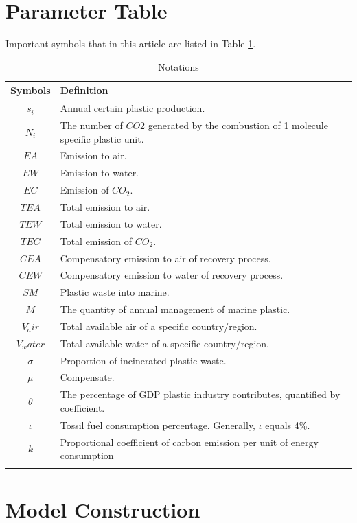 \documentclass{mcmthesis}
\begin{document}
\section{Parameter Table}

Important symbols that in this article are listed in Table \ref{notation}.
\begin{table}[H] 
	\caption{Notations} 
	\center
	\begin{tabular}{cp{}}
		\toprule 
		Symbols &Definition  \\ 
		\midrule 
		$s_i $& Annual certain plastic production.  \\ 
		$N_i$ & The number of $CO2$ generated by the combustion of 1 molecule specific plastic unit. \\ 
		$EA$ & Emission to air. \\ 
		$EW$ & Emission to water.\\
		$EC$ & Emission of $CO_2$.\\
		$TEA$ & Total emission to air.\\
		$TEW$ & Total emission to water.\\
		$TEC$ & Total emission of $CO_2$.\\
		$CEA$ & Compensatory emission to air of recovery process.\\
		$CEW$ & Compensatory emission to water of recovery process.\\
		$SM$ & Plastic waste into marine.\\
		$M$ & The quantity of annual management of marine plastic.\\
		$V_air$ & Total available air of a specific country/region.\\
		$V_water$ & Total available water of a specific country/region.\\
		$\sigma$ & Proportion of incinerated plastic waste.\\
		$\mu$ & Compensate.\\
		$\theta$ & The percentage of GDP plastic industry contributes, quantified by coefficient.\\
		$\iota$ & Tossil fuel consumption percentage. Generally, $\iota$ equals 4\%.\\
		$k$ & Proportional coefficient of carbon emission per unit of
energy consumption\\
		\bottomrule 
		\label{notation}
	\end{tabular} 
\end{table}

\section{Model Construction}
\end{document}
